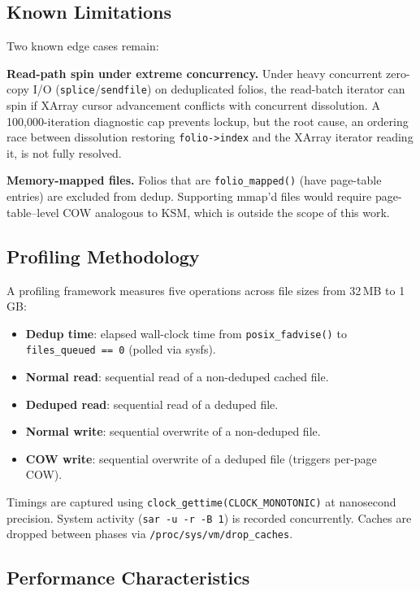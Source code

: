 \documentclass[conference]{IEEEtran}
\begin{document}
\subsection{Known Limitations}

Two known edge cases remain:

\textbf{Read-path spin under extreme concurrency.} Under heavy concurrent zero-copy I/O (\texttt{splice}/\texttt{sendfile}) on deduplicated folios, the read-batch iterator can spin if XArray cursor advancement conflicts with concurrent dissolution. A 100{,}000-iteration diagnostic cap prevents lockup, but the root cause, an ordering race between dissolution restoring \texttt{folio->index} and the XArray iterator reading it, is not fully resolved.

\textbf{Memory-mapped files.} Folios that are \texttt{folio\_mapped()} (have page-table entries) are excluded from dedup. Supporting mmap'd files would require page-table--level COW analogous to KSM, which is outside the scope of this work.

\subsection{Profiling Methodology}

A profiling framework measures five operations across file sizes from 32\,MB to 1\,GB:

\begin{itemize}
    \item \textbf{Dedup time}: elapsed wall-clock time from \texttt{posix\_fadvise()} to \texttt{files\_queued == 0} (polled via sysfs).
    \item \textbf{Normal read}: sequential read of a non-deduped cached file.
    \item \textbf{Deduped read}: sequential read of a deduped file.
    \item \textbf{Normal write}: sequential overwrite of a non-deduped file.
    \item \textbf{COW write}: sequential overwrite of a deduped file (triggers per-page COW).
\end{itemize}

Timings are captured using \texttt{clock\_gettime(CLOCK\_MONOTONIC)} at nanosecond precision. System activity (\texttt{sar -u -r -B 1}) is recorded concurrently. Caches are dropped between phases via \texttt{/proc/sys/vm/drop\_caches}.

\subsection{Performance Characteristics}
\end{document}
